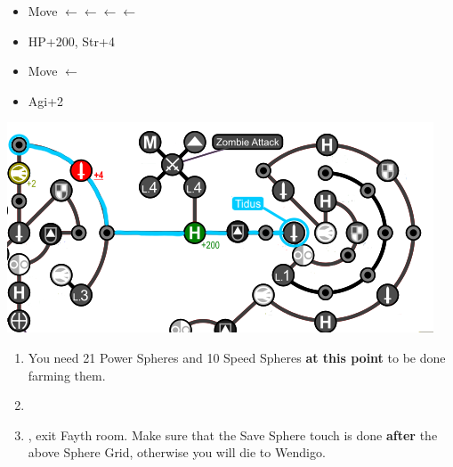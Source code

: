 \begin{spheregrid}
    \begin{itemize}
        \tidusf
        \begin{itemize}
            \item Move $\leftarrow\leftarrow\leftarrow\leftarrow$
            \item HP+200, Str+4
            \item Move $\leftarrow$
            \item Agi+2
        \end{itemize}
        \includegraphics[width=.8\columnwidth]{graphics/Tidus_Post_Seymour}
    \end{itemize}
\end{spheregrid}
\winvfill
\begin{enumerate}[resume]
    \item You need 21 Power Spheres and 10 Speed Spheres \textbf{at this point} to be done farming them.
    \item \formation{\rikku}{\tidus}{\yuna}
    \item \save, exit Fayth room. Make sure that the Save Sphere touch is done \textbf{after} the above Sphere Grid, otherwise you will die to Wendigo.
\end{enumerate}
